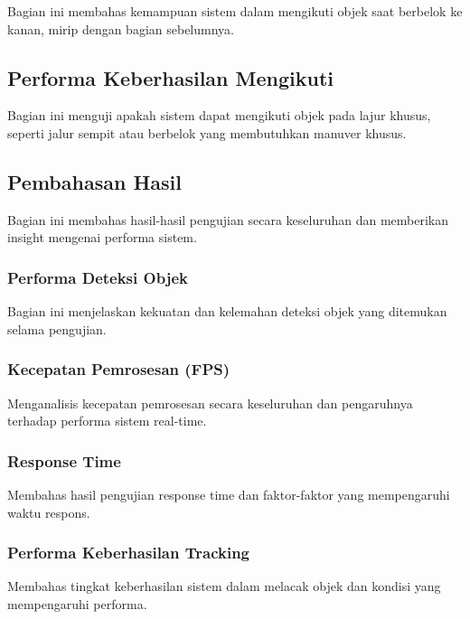 Bagian ini membahas kemampuan sistem dalam mengikuti objek saat berbelok ke kanan, mirip dengan bagian sebelumnya.

\subsection{Performa Keberhasilan Mengikuti}
\label{subsec:performamengikuti}

Bagian ini menguji apakah sistem dapat mengikuti objek pada lajur khusus, seperti jalur sempit atau berbelok yang membutuhkan manuver khusus.

\subsection{Pembahasan Hasil}
\label{subsec:pembahasanhasil}

Bagian ini membahas hasil-hasil pengujian secara keseluruhan dan memberikan insight mengenai performa sistem.

\subsubsection{Performa Deteksi Objek}
\label{subsec:performadeteksiobjek}

Bagian ini menjelaskan kekuatan dan kelemahan deteksi objek yang ditemukan selama pengujian.

\subsubsection{Kecepatan Pemrosesan (FPS)}
\label{subsec:kecepatanpemrosesan}

Menganalisis kecepatan pemrosesan secara keseluruhan dan pengaruhnya terhadap performa sistem real-time.

\subsubsection{Response Time}
\label{subsec:responsetime}

Membahas hasil pengujian response time dan faktor-faktor yang mempengaruhi waktu respons.

\subsubsection{Performa Keberhasilan Tracking}
\label{subsec:performatracking}

Membahas tingkat keberhasilan sistem dalam melacak objek dan kondisi yang mempengaruhi performa.

